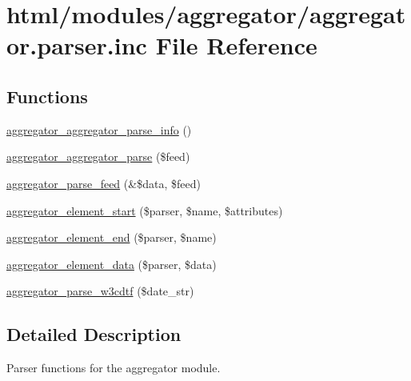 \hypertarget{aggregator_8parser_8inc}{
\section{html/modules/aggregator/aggregator.parser.inc File Reference}
\label{aggregator_8parser_8inc}
}
\subsection*{Functions}
\begin{DoxyCompactItemize}
\item 
\hyperlink{aggregator_8parser_8inc_a394093a4e5442f7e9e842a1103721263}{aggregator\_\-aggregator\_\-parse\_\-info} ()
\item 
\hyperlink{aggregator_8parser_8inc_ae8ba62e5e5e4f942b3b003d91cd50d03}{aggregator\_\-aggregator\_\-parse} (\$feed)
\item 
\hyperlink{aggregator_8parser_8inc_ad522d879ccf727d519a0d0d21dca1f53}{aggregator\_\-parse\_\-feed} (\&\$data, \$feed)
\item 
\hyperlink{aggregator_8parser_8inc_ac2a88dc406806e315a455cb576cc687a}{aggregator\_\-element\_\-start} (\$parser, \$name, \$attributes)
\item 
\hyperlink{aggregator_8parser_8inc_a95d93d9f36d0aed0985f06080951f570}{aggregator\_\-element\_\-end} (\$parser, \$name)
\item 
\hyperlink{aggregator_8parser_8inc_a2bc15daa011069466cc88faa83ded5fc}{aggregator\_\-element\_\-data} (\$parser, \$data)
\item 
\hyperlink{aggregator_8parser_8inc_a7d916aee83570a3a7317d7cd1d7190bb}{aggregator\_\-parse\_\-w3cdtf} (\$date\_\-str)
\end{DoxyCompactItemize}


\subsection{Detailed Description}
Parser functions for the aggregator module. 

